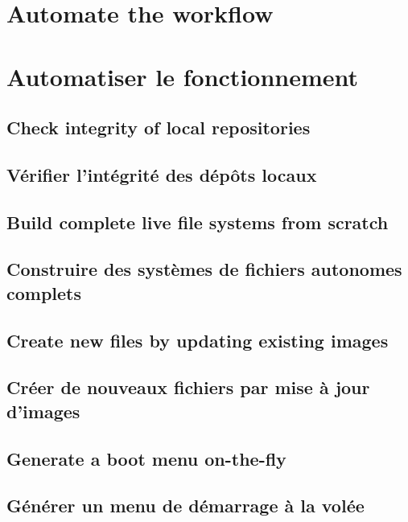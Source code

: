 \ml
{\section{Automate the workflow}}
{\section{Automatiser le fonctionnement}}

\ml
{\subsection{Check integrity of local repositories}}
{\subsection{Vérifier l’intégrité des dépôts locaux}}

\ml
{\subsection{Build complete live file systems from scratch}}
{\subsection{Construire des systèmes de fichiers autonomes complets}}

\ml
{\subsection{Create new files by updating existing images}}
{\subsection{Créer de nouveaux fichiers par mise à jour d’images}}

\ml
{\subsection{Generate a boot menu on-the-fly}}
{\subsection{Générer un menu de démarrage à la volée}}
